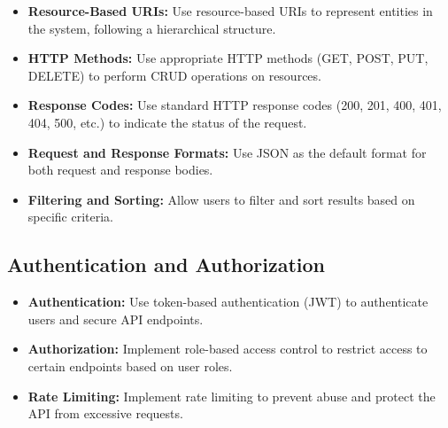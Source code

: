 \begin{itemize}
    \item \textbf{Resource-Based URIs:} Use resource-based URIs to represent entities in the system, following a hierarchical structure.
    \item \textbf{HTTP Methods:} Use appropriate HTTP methods (GET, POST, PUT, DELETE) to perform CRUD operations on resources.
    \item \textbf{Response Codes:} Use standard HTTP response codes (200, 201, 400, 401, 404, 500, etc.) to indicate the status of the request.
    \item \textbf{Request and Response Formats:} Use JSON as the default format for both request and response bodies.
    \item \textbf{Filtering and Sorting:} Allow users to filter and sort results based on specific criteria.
\end{itemize}

\subsection{Authentication and Authorization}

\begin{itemize}
    \item \textbf{Authentication:} Use token-based authentication (JWT) to authenticate users and secure API endpoints.
    \item \textbf{Authorization:} Implement role-based access control to restrict access to certain endpoints based on user roles.
    \item \textbf{Rate Limiting:} Implement rate limiting to prevent abuse and protect the API from excessive requests.
\end{itemize}






